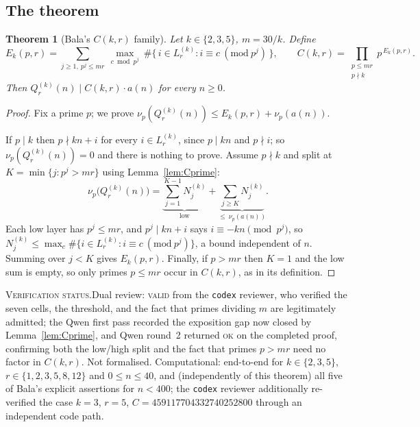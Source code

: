\documentclass[11pt]{article}
\theoremstyle{plain}
\newtheorem{theorem}{Theorem}[section]
\theoremstyle{definition}
\theoremstyle{remark}
\numberwithin{equation}{section}
\newcommand{\vstatus}[1]{%
  \par\vspace{3pt}\noindent
  {\small\textsc{Verification status.}\enspace #1}\par\vspace{3pt}}
\begin{document}
\subsection{The theorem}

\begin{theorem}[Bala's $C(k,r)$ family]
\label{thm:Ckr}
Let $k \in \{2,3,5\}$, $m = 30/k$. Define
\[
  E_k(p,r) = \sum_{j \ge 1,\ p^j \le mr}\ \max_{c \bmod p^j}\
    \#\{\, i \in L^{(k)}_r : i \equiv c \ (\mathrm{mod}\ p^j)\,\},
  \qquad
  C(k,r) = \prod_{\substack{p \le mr\\ p \nmid k}} p^{\,E_k(p,r)} .
\]
Then $Q^{(k)}_r(n) \mid C(k,r)\cdot a(n)$ for every $n \ge 0$.
\end{theorem}

\begin{proof}
Fix a prime $p$; we prove $\nu_p(Q^{(k)}_r(n)) \le E_k(p,r) + \nu_p(a(n))$.

If $p \mid k$ then $p \nmid kn+i$ for every $i \in L^{(k)}_r$, since $p \mid kn$ and
$p \nmid i$; so $\nu_p(Q^{(k)}_r(n)) = 0$ and there is nothing to prove. Assume $p \nmid k$ and
split at $K = \min\{j : p^j > mr\}$ using Lemma~\ref{lem:Cprime}:
\[
  \nu_p\bigl(Q^{(k)}_r(n)\bigr)
  = \underbrace{\sum_{j=1}^{K-1} N^{(k)}_j}_{\text{low}}
  + \underbrace{\sum_{j \ge K} N^{(k)}_j}_{\le\ \nu_p(a(n))} .
\]
Each low layer has $p^j \le mr$, and $p^j \mid kn+i$ says $i \equiv -kn \pmod{p^j}$, so
$N^{(k)}_j \le \max_c \#\{ i \in L^{(k)}_r : i \equiv c \ (\mathrm{mod}\ p^j)\}$, a bound
independent of $n$. Summing over $j < K$ gives $E_k(p,r)$. Finally, if $p > mr$ then $K=1$ and
the low sum is empty, so only primes $p \le mr$ occur in $C(k,r)$, as in its definition.
\end{proof}
\vstatus{Dual review: \textsc{valid} from the \texttt{codex} reviewer, who verified the seven
cells, the threshold, and the fact that primes dividing $m$ are legitimately admitted; the Qwen
first pass recorded the exposition gap now closed by Lemma~\ref{lem:Cprime}, and Qwen round~2
returned \textsc{ok} on the completed proof, confirming both the low/high split and the fact that
primes $p > mr$ need no factor in $C(k,r)$. Not formalised.
Computational: end-to-end for $k \in \{2,3,5\}$, $r \in \{1,2,3,5,8,12\}$ and $0 \le n \le 40$,
and (independently of this theorem) all five of Bala's explicit assertions for $n < 400$; the
\texttt{codex} reviewer additionally
re-verified the case $k=3$, $r=5$, $C = 459117704332740252800$ through an independent code
path.}
\end{document}
